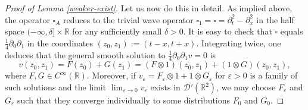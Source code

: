 \documentclass[10pt,a4paper]{article}
\theoremstyle{plain}
\theoremstyle{definition}
\theoremstyle{remark}
\numberwithin{equation}{section}
\newcommand{\R}{\mathbb{R}}
\begin{document}
\begin{proof}[Proof of Lemma \ref{weaker-exist}]
{Let us now do this in detail. As implied above,} 
the operator $\square_A$ reduces to the trivial wave operator ${ \square_1 =} \square =  \partial_t^2 - \partial_x^2$ in the half space $ (-\infty,\delta ] \times \R $ for any sufficiently small $\delta >0$.
It is easy to check that $ \square $ equals  $\frac{1}{4} \partial_{0} \partial_{1}$ in the coordinates $(z_0,z_1) :=  (t-x,  t+x)$. 
Integrating twice, one deduces that the general smooth solution to  $\frac{1}{4} \partial_{0} \partial_{1} v = 0$ is 
\[
 v(z_0,z_1) = F(z_0 ) + G(z_1)  = (F \otimes 1) (z_0,z_1 ) + (1 \otimes G) (z_0,z_1) ,
 \]
 where $F,G \in C^\infty(\R)$. 
Moreover, if  $ v_\varepsilon  = F_\varepsilon \otimes 1 + 1 \otimes G_\varepsilon$ for $\varepsilon >0$  is a family of such solutions and the limit $\lim_{\varepsilon \to 0} v_\varepsilon$ exists in $\mathcal{D}'(\R^2)$, we may choose 
$F_\varepsilon $ and $G_\varepsilon $ such that they converge individually to some distributions $ F_0  $ and $G_0 $. 


\end{proof}
\end{document}
